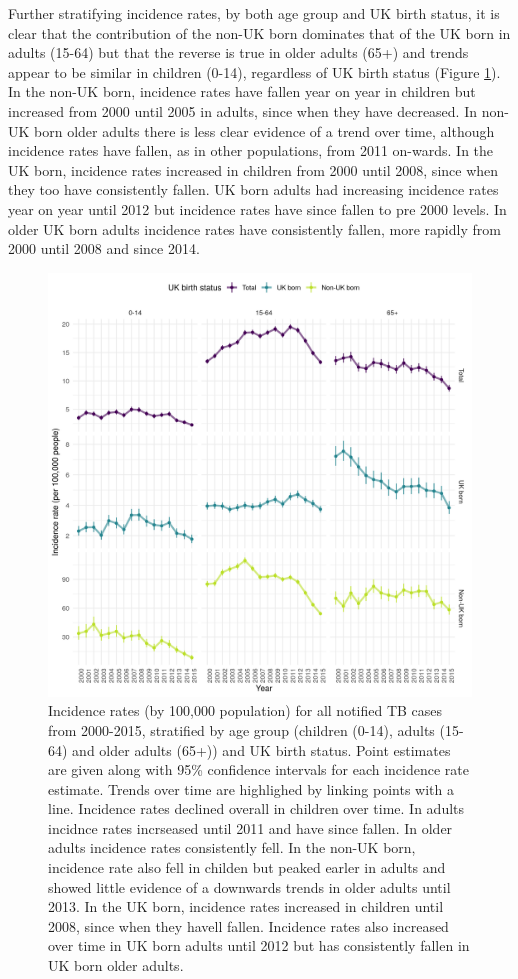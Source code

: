 \documentclass[11pt,twoside]{bristolthesis}
\begin{document}
  Further stratifying incidence rates, by both age group and UK birth status, it is clear that the contribution of the non-UK born dominates that of the UK born in adults (15-64) but that the reverse is true in older adults (65+) and trends appear to be similar in children (0-14), regardless of UK birth status (Figure \ref{fig:plot-age-inc-rates}). In the non-UK born, incidence rates have fallen year on year in children but increased from 2000 until 2005 in adults, since when they have decreased. In non-UK born older adults there is less clear evidence of a trend over time, although incidence rates have fallen, as in other populations, from 2011 on-wards. In the UK born, incidence rates increased in children from 2000 until 2008, since when they too have consistently fallen. UK born adults had increasing incidence rates year on year until 2012 but incidence rates have since fallen to pre 2000 levels. In older UK born adults incidence rates have consistently fallen, more rapidly from 2000 until 2008 and since 2014.
  \begin{figure}
  
  {\centering \includegraphics[width=0.8\linewidth]{chapters/tb-epi-england/figures/plot-age-inc-rates} 
  
  }
  
  \caption{Incidence rates (by 100,000 population) for all notified TB cases from 2000-2015, stratified by age group (children (0-14), adults (15-64) and older adults (65+)) and UK birth status. Point estimates are given along with 95\% confidence intervals for each incidence rate estimate. Trends over time are highlighed by linking points with a line. Incidence rates declined overall in children over time. In adults incidnce rates incrseased until 2011 and have since fallen. In older adults incidence rates consistently fell. In the non-UK born, incidence rate also fell in childen but peaked earler in adults and showed little evidence of a downwards trends in older adults until 2013. In the UK born, incidence rates increased in children until 2008, since when they havell fallen. Incidence rates also increased over time in UK born adults until 2012 but has consistently fallen in UK born older adults.}\label{fig:plot-age-inc-rates}
  \end{figure}
\end{document}
